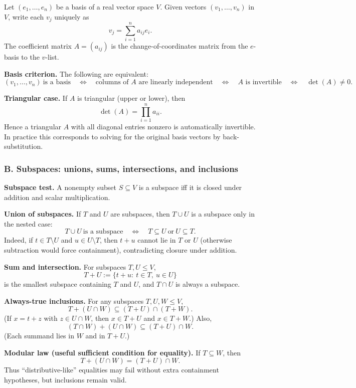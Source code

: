 \documentclass[12pt,a4paper]{article}
\theoremstyle{plain}
\theoremstyle{definition}      %
\begin{document}
Let $(e_1,\dots,e_n)$ be a basis of a real vector space $V$.
Given vectors $(v_1,\dots,v_n)$ in $V$, write each $v_j$ uniquely as
\[
v_j=\sum_{i=1}^n a_{ij} e_i.
\]
The coefficient matrix $A=(a_{ij})$ is the change-of-coordinates matrix from the $e$-basis to the $v$-list.

\medskip
\noindent\textbf{Basis criterion.}
The following are equivalent:
\[
(v_1,\dots,v_n)\ \text{is a basis}
\quad\Longleftrightarrow\quad
\text{columns of }A\text{ are linearly independent}
\quad\Longleftrightarrow\quad
A\text{ is invertible}
\quad\Longleftrightarrow\quad
\det(A)\neq 0.
\]

\medskip
\noindent\textbf{Triangular case.}
If $A$ is triangular (upper or lower), then
\[
\det(A)=\prod_{i=1}^n a_{ii}.
\]
Hence a triangular $A$ with all diagonal entries nonzero is automatically invertible. In practice this corresponds
to solving for the original basis vectors by back-substitution.

\bigskip

\subsubsection*{B. Subspaces: unions, sums, intersections, and inclusions}

\noindent\textbf{Subspace test.}
A nonempty subset $S\subseteq V$ is a subspace iff it is closed under addition and scalar multiplication.

\medskip
\noindent\textbf{Union of subspaces.}
If $T$ and $U$ are subspaces, then $T\cup U$ is a subspace only in the nested case:
\[
T\cup U\ \text{is a subspace}\quad\Longleftrightarrow\quad T\subseteq U\ \text{or}\ U\subseteq T.
\]
Indeed, if $t\in T\setminus U$ and $u\in U\setminus T$, then $t+u$ cannot lie in $T$ or $U$ (otherwise subtraction
would force containment), contradicting closure under addition.

\medskip
\noindent\textbf{Sum and intersection.}
For subspaces $T,U\le V$,
\[
T+U:=\{t+u:\ t\in T,\ u\in U\}
\]
is the smallest subspace containing $T$ and $U$, and $T\cap U$ is always a subspace.

\medskip
\noindent\textbf{Always-true inclusions.}
For any subspaces $T,U,W\le V$,
\[
T+(U\cap W)\subseteq (T+U)\cap(T+W).
\]
(If $x=t+z$ with $z\in U\cap W$, then $x\in T+U$ and $x\in T+W$.)
Also,
\[
(T\cap W)+(U\cap W)\subseteq (T+U)\cap W.
\]
(Each summand lies in $W$ and in $T+U$.)

\medskip
\noindent\textbf{Modular law (useful sufficient condition for equality).}
If $T\subseteq W$, then
\[
T+(U\cap W)=(T+U)\cap W.
\]
Thus ``distributive-like'' equalities may fail without extra containment hypotheses, but inclusions remain valid.
\end{document}
